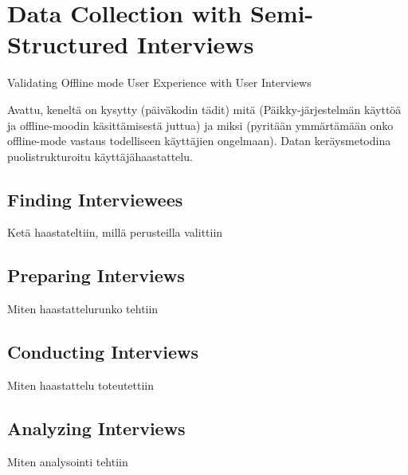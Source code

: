\section{Data Collection with Semi-Structured Interviews}

Validating Offline mode User Experience with User Interviews

Avattu, keneltä on kysytty (päiväkodin tädit) mitä (Päikky-järjestelmän käyttöä ja offline-moodin käsittämisestä juttua) ja miksi (pyritään ymmärtämään onko offline-mode vastaus todelliseen käyttäjien ongelmaan). Datan keräysmetodina puolistrukturoitu käyttäjähaastattelu.

\subsection{Finding Interviewees}
Ketä haastateltiin, millä perusteilla valittiin


\subsection{Preparing Interviews}
Miten haastattelurunko tehtiin


\subsection{Conducting Interviews}
Miten haastattelu toteutettiin


\subsection{Analyzing Interviews}
Miten analysointi tehtiin


  


